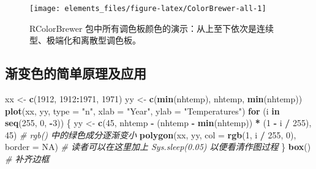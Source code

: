 \documentclass[
  b5paper,
  UTF8,twoside]{book}
\newenvironment{Shaded}{\begin{snugshade}}{\end{snugshade}}
\newcommand{\AttributeTok}[1]{\textcolor[rgb]{0.13,0.29,0.53}{#1}}
\newcommand{\CommentTok}[1]{\textcolor[rgb]{0.56,0.35,0.01}{\textit{#1}}}
\newcommand{\ConstantTok}[1]{\textcolor[rgb]{0.56,0.35,0.01}{#1}}
\newcommand{\ControlFlowTok}[1]{\textcolor[rgb]{0.13,0.29,0.53}{\textbf{#1}}}
\newcommand{\DecValTok}[1]{\textcolor[rgb]{0.00,0.00,0.81}{#1}}
\newcommand{\FunctionTok}[1]{\textcolor[rgb]{0.13,0.29,0.53}{\textbf{#1}}}
\newcommand{\NormalTok}[1]{#1}
\newcommand{\OtherTok}[1]{\textcolor[rgb]{0.56,0.35,0.01}{#1}}
\newcommand{\SpecialCharTok}[1]{\textcolor[rgb]{0.81,0.36,0.00}{\textbf{#1}}}
\newcommand{\StringTok}[1]{\textcolor[rgb]{0.31,0.60,0.02}{#1}}
\begin{document}
\begin{figure}

{\centering \texttt{[image: elements\_files/figure-latex/ColorBrewer-all-1]} 

}

\caption[RColorBrewer 包中所有调色板颜色的演示 ]{RColorBrewer 包中所有调色板颜色的演示：从上至下依次是连续型、极端化和离散型调色板。}\label{fig:ColorBrewer-all}
\end{figure}



\subsection{渐变色的简单原理及应用}\label{ux6e10ux53d8ux8272ux7684ux7b80ux5355ux539fux7406ux53caux5e94ux7528}

\begin{Shaded}
\begin{Highlighting}[]
\NormalTok{xx }\OtherTok{\textless{}{-}} \FunctionTok{c}\NormalTok{(}\DecValTok{1912}\NormalTok{, }\DecValTok{1912}\SpecialCharTok{:}\DecValTok{1971}\NormalTok{, }\DecValTok{1971}\NormalTok{)}
\NormalTok{yy }\OtherTok{\textless{}{-}} \FunctionTok{c}\NormalTok{(}\FunctionTok{min}\NormalTok{(nhtemp), nhtemp, }\FunctionTok{min}\NormalTok{(nhtemp))}
\FunctionTok{plot}\NormalTok{(xx, yy, }\AttributeTok{type =} \StringTok{"n"}\NormalTok{, }\AttributeTok{xlab =} \StringTok{"Year"}\NormalTok{, }\AttributeTok{ylab =} \StringTok{"Temperatures"}\NormalTok{)}
\ControlFlowTok{for}\NormalTok{ (i }\ControlFlowTok{in} \FunctionTok{seq}\NormalTok{(}\DecValTok{255}\NormalTok{, }\DecValTok{0}\NormalTok{, }\SpecialCharTok{{-}}\DecValTok{3}\NormalTok{)) \{}
\NormalTok{  yy }\OtherTok{\textless{}{-}} \FunctionTok{c}\NormalTok{(}\DecValTok{45}\NormalTok{, nhtemp }\SpecialCharTok{{-}}\NormalTok{ (nhtemp }\SpecialCharTok{{-}} \FunctionTok{min}\NormalTok{(nhtemp)) }\SpecialCharTok{*}\NormalTok{ (}\DecValTok{1} \SpecialCharTok{{-}}\NormalTok{ i }\SpecialCharTok{/} \DecValTok{255}\NormalTok{), }\DecValTok{45}\NormalTok{) }\CommentTok{\# rgb() 中的绿色成分逐渐变小}
  \FunctionTok{polygon}\NormalTok{(xx, yy, }\AttributeTok{col =} \FunctionTok{rgb}\NormalTok{(}\DecValTok{1}\NormalTok{, i }\SpecialCharTok{/} \DecValTok{255}\NormalTok{, }\DecValTok{0}\NormalTok{), }\AttributeTok{border =} \ConstantTok{NA}\NormalTok{)}
  \CommentTok{\# 读者可以在这里加上 Sys.sleep(0.05) 以便看清作图过程}
\NormalTok{\}}
\FunctionTok{box}\NormalTok{() }\CommentTok{\# 补齐边框}
\end{Highlighting}
\end{Shaded}
\end{document}
